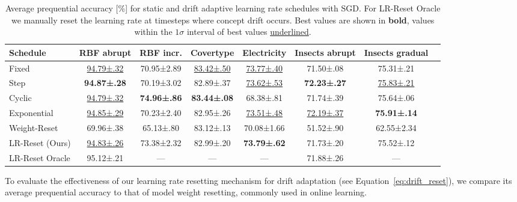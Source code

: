 \documentclass[runningheads]{llncs}
\begin{document}
\begin{table}[ht]
	\centering
	\scriptsize
	\caption{Average prequential accuracy [\%] for static and drift adaptive learning rate schedules with SGD. For LR-Reset Oracle we manually reset the learning rate at timesteps where concept drift occurs. Best values are shown in \textbf{bold}, values within the $1\sigma$ interval of best values \underline{underlined}.}
	\begin{tabular}{lccccccc}
		\toprule
		Schedule        & RBF abrupt            & RBF incr.           & Covertype             & Electricity           & Insects abrupt        & Insects gradual       \\ \midrule
		Fixed           & \underline{94.79±.32} & 70.95±2.89          & \underline{83.42±.50} & \underline{73.77±.40} & 71.50±.08             & 75.31±.21             \\
		Step            & \bfseries 94.87±.28   & 70.19±3.02          & 82.89±.37             & \underline{73.62±.53} & \bfseries 72.23±.27   & \underline{75.83±.21} \\
		Cyclic          & \underline{94.79±.32} & \bfseries 74.96±.86 & \bfseries 83.44±.08   & 68.38±.81             & 71.74±.39             & 75.64±.06             \\
		Exponential     & \underline{94.85±.29} & 70.23±2.40          & 82.95±.26             & \underline{73.51±.48} & \underline{72.19±.37} & \bfseries 75.91±.14   \\
		Weight-Reset    & 69.96±.38             & 65.13±.80           & 83.12±.13             & 70.08±1.66            & 51.52±.90             & 62.55±2.34            \\
		LR-Reset (Ours) & \underline{94.83±.26} & 73.38±2.32          & 82.99±.20             & \bfseries 73.79±.62   & 71.73±.20             & 75.52±.12             \\
		LR-Reset Oracle & 95.12±.21             & ---                 & ---                   & ---                   & 71.88±.26             & ---                   \\ \bottomrule
	\end{tabular}
	\label{tab:lr_resetting}
\end{table}

To evaluate the effectiveness of our learning rate resetting mechanism for drift adaptation (see Equation~\eqref{eq:drift_reset}), we compare its average prequential accuracy to that of model weight resetting, commonly used in online learning.
\end{document}
